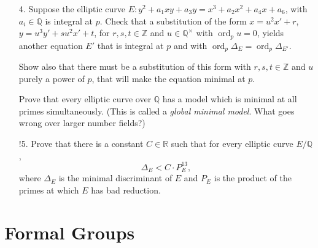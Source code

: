 \documentclass[a4paper]{article}
\theoremstyle{definition}
\DeclareMathOperator{\ord}{ord}
\newcommand{\Z}{\mathbb{Z}}
\newcommand{\Q}{\mathbb{Q}}
\newcommand{\R}{\mathbb{R}}
\begin{document}
\begin{enumerate}
    \item[4.] Suppose the elliptic curve $E:y^2+a_1xy+a_3y=x^3+a_2x^2+a_4x+a_6$,
        with $a_i\in\Q$ is integral at $p$. Check that a substitution of the
        form $x=u^2x'+r$, $y=u^3y'+su^2x'+t$, for $r,s,t\in\Z$ and
        $u\in\Q^\times$ with $\ord_pu=0$, yields another equation $E'$ that is
        integral at $p$ and with $\ord_p\Delta_E=\ord_p\Delta_{E'}$.

        Show also that there must be a substitution of this form with
        $r,s,t\in\Z$ and $u$ purely a power of $p$, that will make the equation
        minimal at $p$.

        Prove that every elliptic curve over $\Q$ has a model which is minimal
        at all primes simultaneously. (This is called a \emph{global minimal
        model}. What goes wrong over larger number fields?)

    \item[!5.] Prove that there is a constant $C\in\R$ such that for every
        elliptic curve $E/\Q$,
        \begin{equation*}
            \Delta_E<C\cdot P_E^{13},
        \end{equation*}
        where $\Delta_E$ is the minimal discriminant of $E$ and $P_E$ is the
        product of the primes at which $E$ has bad reduction.
\end{enumerate}

\newpage

\section{Formal Groups}
\end{document}
